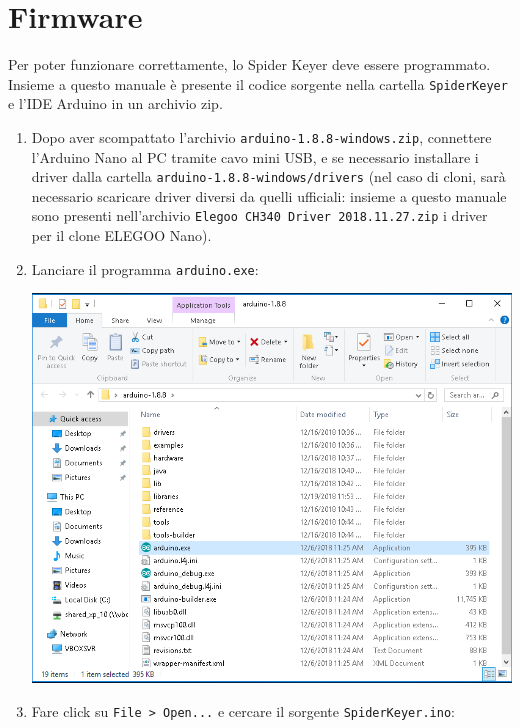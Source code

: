 \section{Firmware}
Per poter funzionare correttamente, lo Spider Keyer deve essere programmato. Insieme a questo manuale \`e presente il codice sorgente nella cartella \texttt{SpiderKeyer} e l'IDE Arduino in un archivio zip.

\begin{enumerate}
	\item Dopo aver scompattato l'archivio \texttt{arduino-1.8.8-windows.zip}, connettere l'Arduino Nano al PC tramite cavo mini USB, e se necessario installare i driver dalla cartella \texttt{arduino-1.8.8-windows/drivers} (nel caso di cloni, sar\`a necessario scaricare driver diversi da quelli ufficiali: insieme a questo manuale sono presenti nell'archivio \texttt{Elegoo CH340 Driver 2018.11.27.zip} i driver per il clone ELEGOO Nano).
	\item Lanciare il programma \texttt{arduino.exe}:
	\begin{center}
		\includegraphics[width=\linewidth]{./firmware01.png}
	\end{center}
	\item Fare click su \texttt{File > Open...} e cercare il sorgente \texttt{SpiderKeyer.ino}:
	\begin{center}

\end{center}
\end{enumerate}
